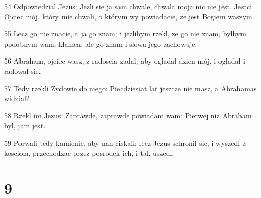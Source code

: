 \par 54 Odpowiedzial Jezus: Jezli sie ja sam chwale, chwala moja nic nie jest. Jestci Ojciec mój, który mie chwali, o którym wy powiadacie, ze jest Bogiem waszym.
\par 55 Lecz go nie znacie, a ja go znam; i jezlibym rzekl, ze go nie znam, bylbym podobnym wam, klamca; ale go znam i slowa jego zachowuje.
\par 56 Abraham, ojciec wasz, z radoscia zadal, aby ogladal dzien mój, i ogladal i radowal sie.
\par 57 Tedy rzekli Zydowie do niego: Piecdziesiat lat jeszcze nie masz, a Abrahamas widzial?
\par 58 Rzekl im Jezus: Zaprawde, zaprawde powiadam wam: Pierwej niz Abraham byl, jam jest.
\par 59 Porwali tedy kamienie, aby nan ciskali; lecz Jezus schronil sie, i wyszedl z kosciola, przechodzac przez posrodek ich, i tak uszedl.

\chapter{9}

